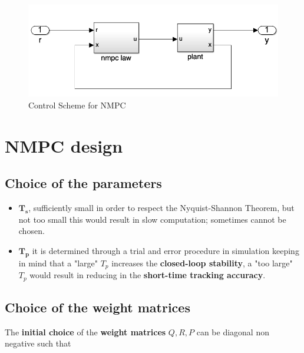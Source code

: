 \begin{figure}[h]
    \centering
    \includegraphics[scale=0.7]{NonLinearControl/images/NMPC_CtrlScheme.png}
    \caption{Control Scheme for NMPC}
    \label{fig:NMPC_ctrl}
\end{figure}

\section{NMPC design}

\subsection{Choice of the parameters}
\begin{itemize}
    \item $\mathbf{T_s}$, sufficiently small in order to respect the Nyquist-Shannon Theorem, but not too small this would result in slow computation; sometimes cannot be chosen.
    \item $\mathbf{T_p}$ it is determined through a trial and error procedure in simulation keeping in mind that a "large" $T_p$ increases the \textbf{closed-loop stability}, a "too large" $T_p$ would result in reducing in the \textbf{short-time tracking accuracy}.
\end{itemize}

\subsection{Choice of the weight matrices}
The \textbf{initial choice} of the \textbf{weight matrices} $Q, R, P$ can be diagonal non negative  such that \\

